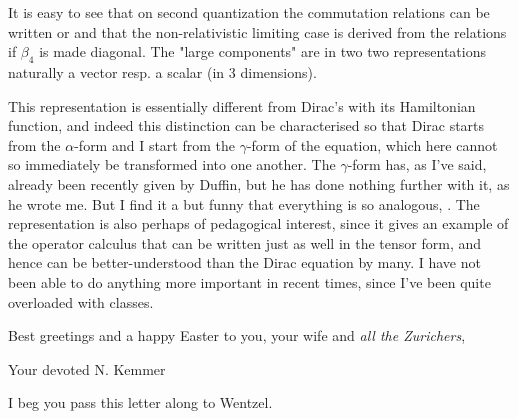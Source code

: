 It is easy to see that on second quantization the commutation relations can be written
or
and that the non-relativistic limiting case is derived from the relations
if $\beta_4$ is made diagonal. The "large components" are in two two representations naturally a vector resp. a scalar (in 3 dimensions).

This representation is essentially different from Dirac's with its Hamiltonian function, and indeed this distinction can be characterised so that Dirac starts from the $\alpha$-form and I start from the $\gamma$-form of the equation, which here cannot so immediately be transformed into one another. The $\gamma$-form has, as I've said, already been recently given by Duffin, but he has done nothing further with it, as he wrote me. But I find it a but funny that everything is so analogous, . The representation is also perhaps of pedagogical interest, since it gives an example of the operator calculus that can be written just as well in the tensor form, and hence can be better-understood than the Dirac equation by many. I have not been able to do anything more important in recent times, since I've been quite overloaded with classes.

Best greetings and a happy Easter to you, your wife and \textit{all the Zurichers},

Your devoted N. Kemmer

I beg you pass this letter along to Wentzel.
